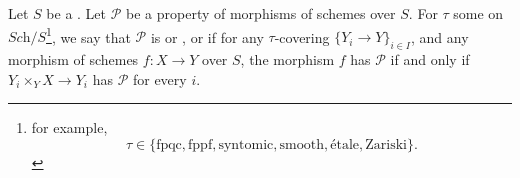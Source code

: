 \begin{definition} \label{definition:tau_local_property_of_a_morphism_of_schemes_over_a_scheme}
    Let $S$ be a . Let $\mathcal{P}$ be a property of morphisms of schemes over $S$. For $\tau$ some  on $\textit{Sch}/S$\footnote{for example, $$\tau \in \{\text{fpqc}, \text{fppf}, \text{syntomic}, \text{smooth}, \text{\'etale}, \text{Zariski}\}.$$},  we say that $\mathcal{P}$ is  or , or  if for any $\tau$-covering $\{Y_i \to Y\}_{i \in I}$, and any morphism of schemes $f: X \to Y$ over $S$, the morphism $f$ has $\mathcal{P}$ if and only if $Y_i \times_Y X \to Y_i$ has $\mathcal{P}$ for every $i$. 
\end{definition}